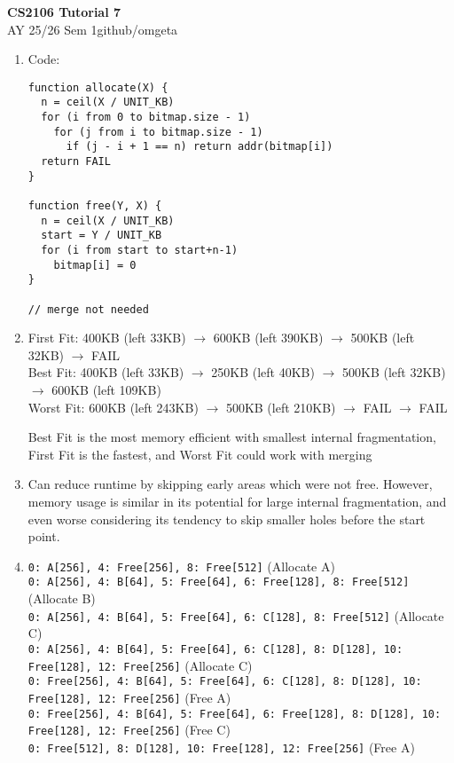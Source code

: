 \documentclass[12pt, a4paper]{article}
\newcommand{\mytitle}{CS2106 Tutorial 7}
\newcommand{\myauthor}{github/omgeta}
\newcommand{\mydate}{AY 25/26 Sem 1}
\begin{document}
\raggedright
\footnotesize
\begin{center}
{\normalsize{\textbf{\mytitle}}} \\
{\footnotesize{\mydate\hspace{2pt}\textemdash\hspace{2pt}\myauthor}}
\end{center}
\begin{enumerate}[Q\arabic*.]
  \item Code:
    \begin{lstlisting}
function allocate(X) {
  n = ceil(X / UNIT_KB) 
  for (i from 0 to bitmap.size - 1) 
    for (j from i to bitmap.size - 1) 
      if (j - i + 1 == n) return addr(bitmap[i])
  return FAIL
}

function free(Y, X) {
  n = ceil(X / UNIT_KB)
  start = Y / UNIT_KB
  for (i from start to start+n-1) 
    bitmap[i] = 0
}

// merge not needed
    \end{lstlisting}

  \item First Fit: 400KB (left 33KB) $\rightarrow$ 600KB (left 390KB) $\rightarrow$ 500KB (left 32KB) $\rightarrow$ FAIL\\
    Best Fit: 400KB (left 33KB) $\rightarrow$ 250KB (left 40KB) $\rightarrow$ 500KB (left 32KB) $\rightarrow$ 600KB (left 109KB)\\
    Worst Fit: 600KB (left 243KB) $\rightarrow$ 500KB (left 210KB) $\rightarrow$ FAIL $\rightarrow$ FAIL

    Best Fit is the most memory efficient with smallest internal fragmentation, First Fit is the fastest, and Worst Fit could work with merging

  \item Can reduce runtime by skipping early areas which were not free. However, memory usage is similar in its potential for large internal fragmentation, and even worse considering its tendency to skip smaller holes before the start point. 

  \item \lstinline|0: A[256], 4: Free[256], 8: Free[512]| (Allocate A)\\
    \lstinline|0: A[256], 4: B[64], 5: Free[64], 6: Free[128], 8: Free[512]| (Allocate B)\\
    \lstinline|0: A[256], 4: B[64], 5: Free[64], 6: C[128], 8: Free[512]| (Allocate C)\\
    \lstinline|0: A[256], 4: B[64], 5: Free[64], 6: C[128], 8: D[128], 10: Free[128], 12: Free[256]| (Allocate C)\\
    \lstinline|0: Free[256], 4: B[64], 5: Free[64], 6: C[128], 8: D[128], 10: Free[128], 12: Free[256]| (Free A)\\
    \lstinline|0: Free[256], 4: B[64], 5: Free[64], 6: Free[128], 8: D[128], 10: Free[128], 12: Free[256]| (Free C)\\
    \lstinline|0: Free[512], 8: D[128], 10: Free[128], 12: Free[256]| (Free A)\\


\end{enumerate}
\end{document}
